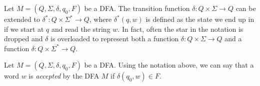 \begin{definition}
\label{definition:Extended-transition-function}
Let $M = (Q, \Sigma, \delta, q_0, F)$ be a DFA. The transition function $\delta : Q \times \Sigma \to Q$ can be extended to $\delta^* : Q \times \Sigma^* \to Q$, where $\delta^*(q, w)$ is defined as the state we end up in if we start at $q$ and read the string $w$. In fact, often the star in the notation is dropped and $\delta$ is overloaded to represent both a function $\delta : Q \times \Sigma \to Q$ and a function $\delta : Q \times \Sigma^* \to Q$. 

\end{definition}

\begin{note}
\label{note:Alternative-definition-of-a-DFA-accepting-a-string}
Let $M = (Q, \Sigma, \delta, q_0, F)$ be a DFA. Using the notation above, we can say that a word $w$ is \emph{accepted} by the DFA $M$ if $\delta(q_0, w) \in F$.

\end{note}

